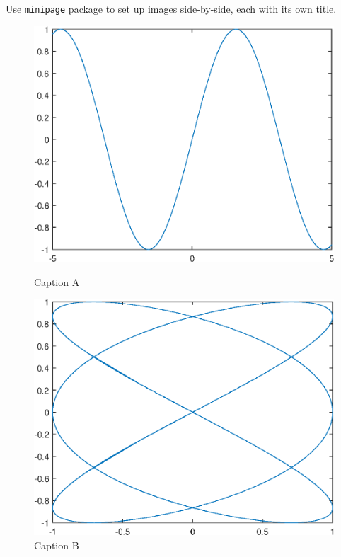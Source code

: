 \documentclass[openany,twoside,12pt]{book}
\theoremstyle{plain}
\numberwithin{equation}{chapter}
\numberwithin{figure}{chapter}
\numberwithin{table}{chapter}
\begin{document}
Use \texttt{minipage} package to set up images side-by-side, each with its own title.
\begin{figure}[htp!]
\begin{minipage}[t]{0.48\linewidth}
  \centering
  \includegraphics[width=0.96\linewidth]{image1}
  \caption{Caption A}
  \label{fig:image1}
\end{minipage}
\hfill
\begin{minipage}[t]{0.48\linewidth}
\centering
   \includegraphics[width=0.95\linewidth]{image2}
   \caption{Caption B}
   \label{fig:image2}
\end{minipage}
\end{figure}
\end{document}
